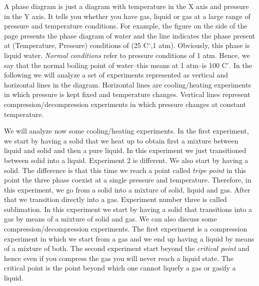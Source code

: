 \documentclass[main.tex]{subfiles}
\begin{document}
\begin{description}
\begin{center}
\begin{tikzpicture}
\end{tikzpicture}\end{center}


\item[\docfilehook{Phase diagram of water}{}] A phase diagram is just a diagram with temperature in the X axis and pressure in the Y axis. It tells you whether you have gas, liquid or gas at a large range of pressure and temperature conditions. For example, the figure on the side of the page presents the phase diagram of water and the line indicates the phase present at (Temperature, Pressure) conditions of (25 C$^{\circ}$,1 atm). Obviously, this phase is liquid water. \emph{Normal conditions} refer to pressure conditions of 1 atm. Hence, we say that the normal boiling point of water--this means at 1 atm--is 100 C$^{\circ}$. In the following we will analyze a set of experiments represented as vertical and horizontal lines in the diagram. Horizontal lines are cooling/heating experiments in which pressure is kept fixed and temperature changes. Vertical lines represent compression/decompression experiments in which pressure changes at constant temperature.




\item[\docfilehook{Heating and compression experiments}{}] 
We will analyze now some cooling/heating experiments. In the first experiment, we start by having a solid that we  heat up to obtain first a mixture between liquid and solid and then a pure liquid. In this experiment we just transitioned between solid into a liquid. Experiment 2 is different. We also start by having a solid. The difference is that this time we reach a point called \emph{tripe point} in this point the three phase coexist at a single pressure and temperature. Therefore, in this experiment, we go from a solid into a mixture of solid, liquid and gas. After that we transition directly into a gas. Experiment number three is called sublimation. In this experiment we start by having a solid that transitions into a gas by means of a mixture of solid and gas. We can also discuss some compression/decompression experiments. The first experiment is a compression experiment in which we start from a gas and we end up having a liquid by means of a mixture of both. The second experiment start beyond the \emph{critical point} and hence even if you compress the gas you will never reach a liquid state. The critical point is the point beyond which one cannot liquefy a gas or gasify a liquid.


\end{description}
\end{document}
